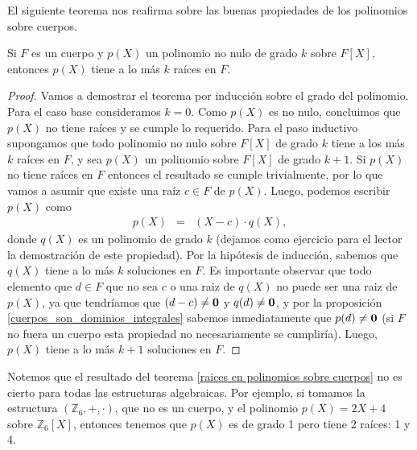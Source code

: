 El siguiente teorema nos reafirma sobre las buenas propiedades de los polinomios sobre cuerpos.
\begin{theorem}\label{raices en polinomios sobre cuerpos}
Si $F$ es un cuerpo y $p(X)$ un polinomio no nulo de grado $k$ sobre $F[X]$, entonces $p(X)$ tiene a lo más $k$ raíces en $F$.
\end{theorem}
\begin{proof}
Vamos a demostrar el teorema por inducción sobre el grado del
polinomio. Para el caso base consideramos $k=0$. Como $p(X)$ es no
nulo, concluimos que $p(X)$ no tiene raíces y se cumple lo
requerido. Para el paso inductivo supongamos que todo polinomio no
nulo sobre $F[X]$ de grado $k$ tiene a los más $k$ raíces en $F$, y
sea $p(X)$ un polinomio sobre $F[X]$ de grado $k+1$. Si $p(X)$ no
tiene raíces en $F$ entonces el resultado se cumple trivialmente, por
lo que vamos a asumir que existe una raíz $c \in F$ de
$p(X)$. Luego, podemos escribir $p(X)$ como
\begin{eqnarray*}
p(X) & = & (X-c)\cdot q(X),
\end{eqnarray*}
donde $q(X)$ es un polinomio de grado $k$ (dejamos como ejercicio para
el lector la demostración de este propiedad).
Por la hipótesis de inducción, sabemos que $q(X)$ tiene a lo más $k$
soluciones en $F$. Es importante observar que todo elemento que $d\in
F$ que no sea $c$ o una raiz de $q(X)$ no puede ser una raiz de
$p(X)$, ya que tendríamos que $(d-c)\neq \mathbf{0}$ y $q(d)\neq \mathbf{0}$, y por la proposición \ref{cuerpos_son_dominios_integrales}
sabemos inmediatamente que $p(d)\neq\mathbf{0}$ (si $F$ no fuera un cuerpo
esta propiedad no necesariamente se cumpliría).  Luego, $p(X)$ tiene a
lo más $k+1$ soluciones en $F$.
\end{proof}
Notemos que el resultado del teorema \ref{raices en polinomios sobre
cuerpos} no es cierto para todas las estructuras algebraicas. Por
ejemplo, si tomamos la estructura $(\mathbb{Z}_6,+,\cdot)$, que no es
un cuerpo, y el polinomio $p(X) = 2X+4$ sobre $\mathbb{Z}_6[X]$,
entonces tenemos que $p(X)$ es de grado 1 pero tiene 2 raíces: 1 y 4.

